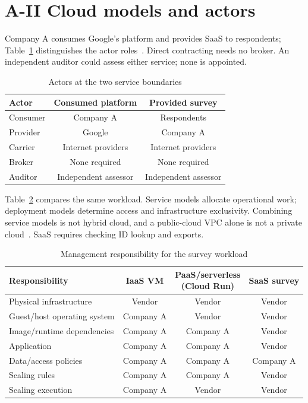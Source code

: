 \section*{A-II Cloud models and actors}

Company A consumes Google's platform and provides SaaS to respondents; Table~\ref{tab:actors} distinguishes the actor roles~\cite{nist}. Direct contracting needs no broker. An independent auditor could assess either service; none is appointed.

\begin{table}[htbp]
\centering
\caption{Actors at the two service boundaries}
\label{tab:actors}
\ifcountonly\else
\begin{tabular}{@{}lcc@{}}
\toprule
Actor & Consumed platform & Provided survey \\
\midrule
Consumer & Company A & Respondents \\
Provider & Google & Company A \\
Carrier & Internet providers & Internet providers \\
Broker & None required & None required \\
Auditor & Independent assessor & Independent assessor \\
\bottomrule
\end{tabular}
\fi
\end{table}

Table~\ref{tab:responsibility} compares the same workload. Service models allocate operational work; deployment models determine access and infrastructure exclusivity. Combining service models is not hybrid cloud, and a public-cloud VPC alone is not a private cloud~\cite{nist}. SaaS requires checking ID lookup and exports.

\begin{table}[htbp]
\centering
\caption{Management responsibility for the survey workload}
\label{tab:responsibility}
\ifcountonly\else
\small
\begin{tabularx}{\linewidth}{@{}Xccc@{}}
\toprule
Responsibility & IaaS VM & \shortstack{PaaS/serverless\\(Cloud Run)} & SaaS survey \\
\midrule
Physical infrastructure & Vendor & Vendor & Vendor \\
Guest/host operating system & Company A & Vendor & Vendor \\
Image/runtime dependencies & Company A & Company A & Vendor \\
Application & Company A & Company A & Vendor \\
Data/access policies & Company A & Company A & Company A \\
Scaling rules & Company A & Company A & Vendor \\
Scaling execution & Company A & Vendor & Vendor \\
\bottomrule
\end{tabularx}
\fi
\end{table}

